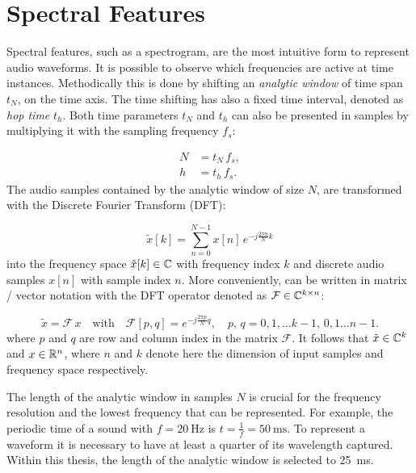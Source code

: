 
\section{Spectral Features}\label{sec:signal_spec}
Spectral features, such as a spectrogram, are the most intuitive form to represent audio waveforms. 
It is possible to observe which frequencies are active at time instances.
Methodically this is done by shifting an \emph{analytic window} of time span $t_N$, on the time axis.
The time shifting has also a fixed time interval, denoted as \emph{hop time} $t_{h}$.
Both time parameters $t_N$ and $t_h$ can also be presented in samples by multiplying it with the sampling frequency $f_s$:

\begin{equation}
  \begin{split}
    N &= t_N \, f_s, \\
    h &= t_h \, f_s.
  \end{split}
\end{equation}
The audio samples contained by the analytic window of size $N$, are transformed with the Discrete Fourier Transform (DFT):

\begin{equation}\label{eq:signal_spec_dtft}
  \tilde{x}[k] = \sum_{n=0}^{N-1} x[n] \, e^{-j\frac{2 \pi n}{N}k}
\end{equation}
into the frequency space $\tilde{x}[k] \in \mathbb{C}$ with frequency index $k$ and discrete audio samples $x[n]$ with sample index $n$.
More conveniently,  can be written in matrix / vector notation with the DFT operator denoted as $\mathcal{F} \in \mathbb{C}^{k \times n}$:

\begin{equation}\label{eq:signal_spec_dtft_matrix}
  \tilde{x} = \mathcal{F}\, x \quad \mathrm{with} 
  \quad \mathcal{F}[p, q] = e^{-j\frac{2 \pi p}{N} q},
  \quad p,\, q = 0, 1, \dots k-1,\, 0, 1 \dots n-1.
\end{equation}
where $p$ and $q$ are row and column index in the matrix $\mathcal{F}$.
It follows that $\tilde{x} \in \mathbb{C}^k$ and $x \in \mathbb{R}^n$, where $n$ and $k$ denote here the dimension of input samples and frequency space respectively.

The length of the analytic window in samples $N$ is crucial for the frequency resolution and the lowest frequency that can be represented.
For example, the periodic time of a sound with $f=\SI{20}{\hertz}$ is $t=\frac{1}{f} = \SI{50}{\milli\second}$.
To represent a waveform it is necessary to have at least a quarter of its wavelength captured.
Within this thesis, the length of the analytic window is selected to \SI{25}{\milli\second}.

